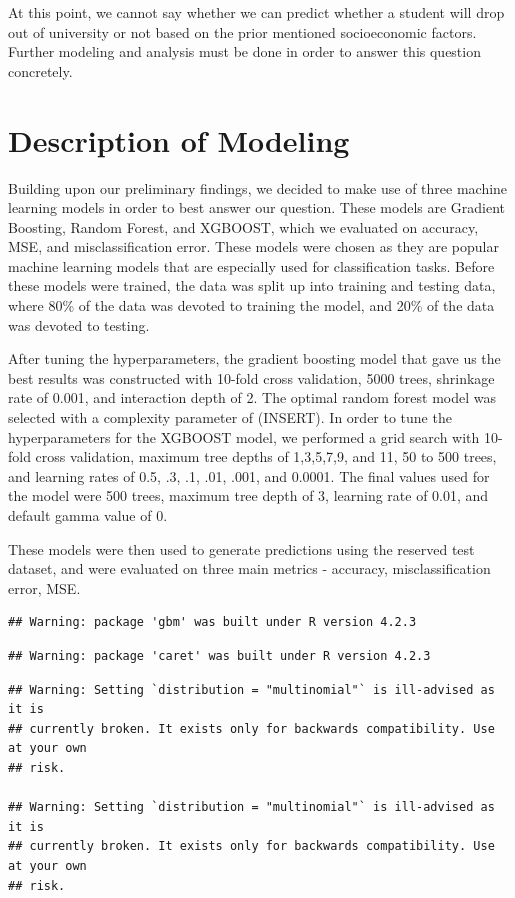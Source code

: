 \documentclass[
]{article}
\begin{document}
At this point, we cannot say whether we can predict whether a student
will drop out of university or not based on the prior mentioned
socioeconomic factors. Further modeling and analysis must be done in
order to answer this question concretely.

\hypertarget{description-of-modeling}{%
\section{Description of Modeling}\label{description-of-modeling}}

Building upon our preliminary findings, we decided to make use of three
machine learning models in order to best answer our question. These
models are Gradient Boosting, Random Forest, and XGBOOST, which we
evaluated on accuracy, MSE, and misclassification error. These models
were chosen as they are popular machine learning models that are
especially used for classification tasks. Before these models were
trained, the data was split up into training and testing data, where
80\% of the data was devoted to training the model, and 20\% of the data
was devoted to testing.

After tuning the hyperparameters, the gradient boosting model that gave
us the best results was constructed with 10-fold cross validation, 5000
trees, shrinkage rate of 0.001, and interaction depth of 2. The optimal
random forest model was selected with a complexity parameter of
(INSERT). In order to tune the hyperparameters for the XGBOOST model, we
performed a grid search with 10-fold cross validation, maximum tree
depths of 1,3,5,7,9, and 11, 50 to 500 trees, and learning rates of 0.5,
.3, .1, .01, .001, and 0.0001. The final values used for the model were
500 trees, maximum tree depth of 3, learning rate of 0.01, and default
gamma value of 0.

These models were then used to generate predictions using the reserved
test dataset, and were evaluated on three main metrics - accuracy,
misclassification error, MSE.

\begin{verbatim}
## Warning: package 'gbm' was built under R version 4.2.3
\end{verbatim}

\begin{verbatim}
## Warning: package 'caret' was built under R version 4.2.3
\end{verbatim}

\begin{verbatim}
## Warning: Setting `distribution = "multinomial"` is ill-advised as it is
## currently broken. It exists only for backwards compatibility. Use at your own
## risk.

## Warning: Setting `distribution = "multinomial"` is ill-advised as it is
## currently broken. It exists only for backwards compatibility. Use at your own
## risk.
\end{verbatim}
\end{document}

